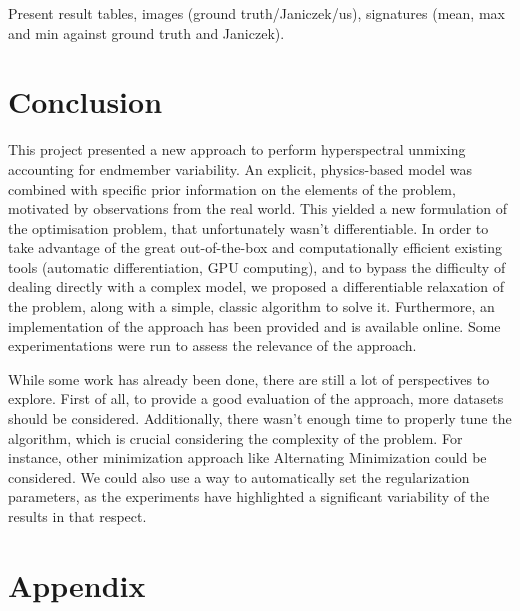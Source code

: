 \documentclass{article}
\begin{document}
Present result tables, images (ground truth/Janiczek/us), signatures (mean, max and min against ground truth and Janiczek).


\section{Conclusion}

This project presented a new approach to perform hyperspectral unmixing accounting for endmember variability. An explicit, physics-based model was combined with specific prior information on the elements of the problem, motivated by observations from the real world. This yielded a new formulation of the optimisation problem, that unfortunately wasn't differentiable. In order to take advantage of the great out-of-the-box and computationally efficient existing tools (automatic differentiation, GPU computing), and to bypass the difficulty of dealing directly with a complex model, we proposed a differentiable relaxation of the problem, along with a simple, classic algorithm to solve it. Furthermore, an implementation of the approach has been provided and is available online. Some experimentations were run to assess the relevance of the approach.

While some work has already been done, there are still a lot of perspectives to explore. First of all, to provide a good evaluation of the approach, more datasets should be considered. Additionally, there wasn't enough time to properly tune the algorithm, which is crucial considering the complexity of the problem. For instance, other minimization approach like Alternating Minimization could be considered. We could also use a way to automatically set the regularization parameters, as the experiments have highlighted a significant variability of the results in that respect.




% 



\section{Appendix}
\end{document}
